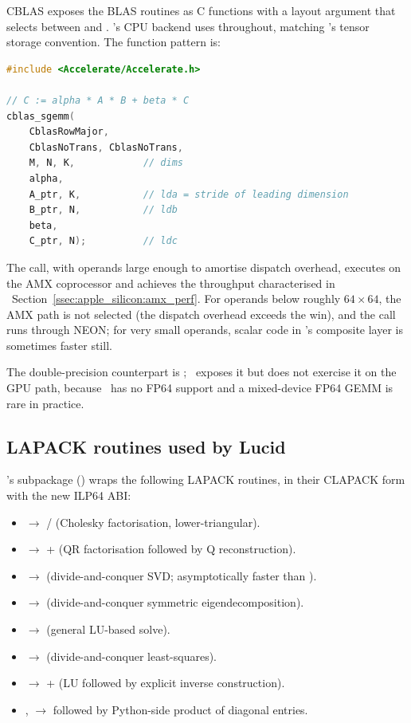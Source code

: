 CBLAS exposes the BLAS routines as C functions with a layout
argument that selects between  and
. \Lucid's CPU backend uses 
throughout, matching \Lucid's tensor storage convention. The
function pattern is:

\begin{lstlisting}[style=lucidcpp,language=C++]
#include <Accelerate/Accelerate.h>

// C := alpha * A * B + beta * C
cblas_sgemm(
    CblasRowMajor,
    CblasNoTrans, CblasNoTrans,
    M, N, K,            // dims
    alpha,
    A_ptr, K,           // lda = stride of leading dimension
    B_ptr, N,           // ldb
    beta,
    C_ptr, N);          // ldc
\end{lstlisting}

The  call, with operands large enough to amortise
dispatch overhead, executes on the AMX coprocessor and achieves
the throughput characterised in
~Section~\ref{ssec:apple_silicon:amx_perf}.
For operands below roughly $64 \times 64$, the AMX path is not
selected (the dispatch overhead exceeds the win), and the call
runs through NEON; for very small operands, scalar code in
\Lucid's composite layer is sometimes faster still.

The double-precision counterpart is ; \Lucid\
exposes it but does not exercise it on the GPU path, because
\Metal\ has no FP64 support and a mixed-device FP64 GEMM is rare
in practice.

\subsection{LAPACK routines used by Lucid}
\label{ssec:accelerate:lapack_used}

\Lucid's  subpackage () wraps the
following LAPACK routines, in their CLAPACK form with the new
ILP64 ABI:

\begin{itemize}
  \item {} \(\to\)  / 
    (Cholesky factorisation, lower-triangular).
  \item {} \(\to\)  + 
    (QR factorisation followed by Q reconstruction).
  \item {} \(\to\)  (divide-and-conquer SVD;
    asymptotically faster than \code{sgesvd}).
  \item {} \(\to\)  (divide-and-conquer
    symmetric eigendecomposition).
  \item {} \(\to\)  (general LU-based
    solve).
  \item {} \(\to\)  (divide-and-conquer
    least-squares).
  \item {} \(\to\)  +  (LU
    followed by explicit inverse construction).
  \item {},  \(\to\)  followed
    by Python-side product of diagonal entries.
\end{itemize}

